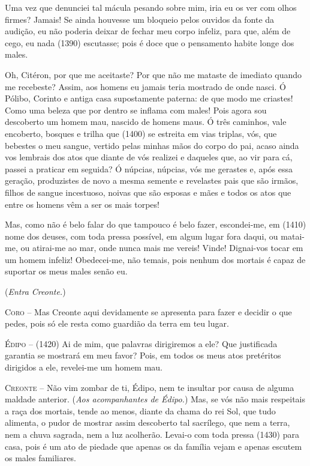 Uma vez que denunciei tal mácula pesando sobre mim, iria eu os ver com
olhos firmes? Jamais! Se ainda houvesse um bloqueio pelos ouvidos da
fonte da audição, eu não poderia deixar de fechar meu corpo infeliz,
para que, além de cego, eu nada (1390) escutasse; pois é doce que o
pensamento habite longe dos males.

Oh, Citéron, por que me aceitaste? Por que não me mataste de imediato
quando me recebeste? Assim, aos homens eu jamais teria mostrado de onde
nasci. Ó Pólibo, Corinto e antiga casa supostamente paterna: de que modo
me criastes! Como uma beleza que por dentro se inflama com males! Pois
agora sou descoberto um homem mau, nascido de homens maus. Ó três
caminhos, vale encoberto, bosques e trilha que (1400) se estreita em
vias triplas, vós, que bebestes o meu sangue, vertido pelas minhas mãos
do corpo do pai, acaso ainda vos lembrais dos atos que diante de vós
realizei e daqueles que, ao vir para cá, passei a praticar em seguida? Ó
núpcias, núpcias, vós me gerastes e, após essa geração, produzistes de
novo a mesma semente e revelastes pais que são irmãos, filhos de sangue
incestuoso, noivas que são esposas e mães e todos os atos que entre os
homens vêm a ser os mais torpes!

Mas, como não é belo falar do que tampouco é belo fazer, escondei-me, em
(1410) nome dos deuses, com toda pressa possível, em algum lugar fora
daqui, ou matai-me, ou atirai-me ao mar, onde nunca mais me vereis!
Vinde! Dignai-vos tocar em um homem infeliz! Obedecei-me, não temais,
pois nenhum dos mortais é capaz de suportar os meus males senão eu.

(\emph{Entra Creonte.})

\textsc{Coro} --   Mas Creonte aqui devidamente se apresenta para fazer e decidir o que
pedes, pois só ele resta como guardião da terra em teu lugar.

\textsc{Édipo} --   (1420) Ai de mim, que palavras dirigiremos a ele? Que justificada
garantia se mostrará em meu favor? Pois, em todos os meus atos
pretéritos dirigidos a ele, revelei-me um homem mau.

\textsc{Creonte} --   Não vim zombar de ti, Édipo, nem te insultar por causa de alguma maldade
anterior. (\emph{Aos acompanhantes de Édipo.}) Mas, se vós não mais
respeitais a raça dos mortais, tende ao menos, diante da chama do rei
Sol, que tudo alimenta, o pudor de mostrar assim descoberto tal
sacrílego, que nem a terra, nem a chuva sagrada, nem a luz acolherão.
Levai-o com toda pressa (1430) para casa, pois é um ato de piedade que
apenas os da família vejam e apenas escutem os males familiares.


